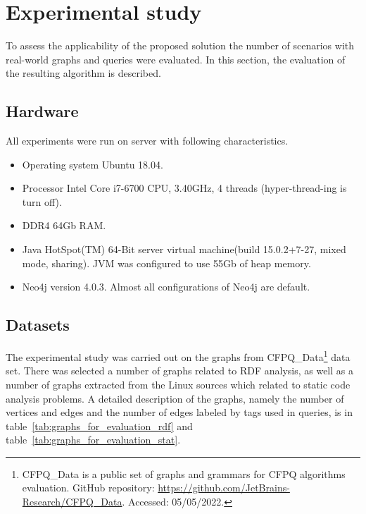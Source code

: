 \section{Experimental study}\label{ps}
To assess the applicability of the proposed solution the number of scenarios with real-world graphs and queries were evaluated.  In this section, the evaluation of the resulting algorithm is described. 
\subsection{Hardware}
All experiments were run on server with following characteristics.

\begin{itemize}
    \item Operating system Ubuntu 18.04.
    \item Processor Intel Core i7-6700 CPU, 3.40GHz, 4 threads (hyper-thread-ing is turn off).
    \item DDR4 64Gb RAM.
    \item Java HotSpot(TM) 64-Bit server virtual machine(build 15.0.2+7-27, mixed mode, sharing). JVM was configured to use 55Gb of heap memory.
    \item Neo4j version 4.0.3. Almost all configurations of Neo4j are default. 
\end{itemize}

\subsection{Datasets}
The experimental study was carried out on the graphs from CFPQ\_Data\footnote{CFPQ\_Data is a public set of graphs and grammars for CFPQ algorithms evaluation. GitHub repository: \url{https://github.com/JetBrains-Research/CFPQ_Data}. Accessed: 05/05/2022. } data set. There was selected a number of graphs related to RDF analysis, as well as a number of graphs extracted from the Linux sources which related to static code analysis problems. A detailed description of the graphs, namely the number of vertices and edges and the number of edges labeled by tags used in queries, is in table~\ref{tab:graphs_for_evaluation_rdf} and table~\ref{tab:graphs_for_evaluation_stat}. 

